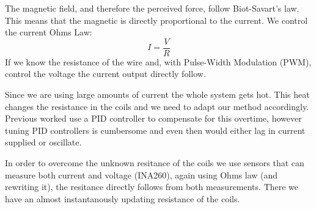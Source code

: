 The magnetic field, and therefore the perceived force, follow Biot-Savart's law. This means that the magnetic is directly proportional to the current. We control the current Ohms Law:
\begin{equation}
    I = \frac{V}{R}
\end{equation}
If we know the resistance of the wire and, with Pulse-Width Modulation (PWM), control the voltage the current output directly follow.

Since we are using large amounts of current the whole system gets hot. This heat changes the resistance in the coils and we need to adapt our method accordingly. Previous worked use a PID controller to compensate for this overtime, however tuning PID controllers is cumbersome and even then would either lag in current supplied or oscillate. 

In order to overcome the unknown resitance of the coils we use sensors that can measure both current and voltage (INA260), again using Ohms law (and rewriting it), the resitance directly follows from both measurements. There we have an almost instantanously updating resistance of the coils. 
